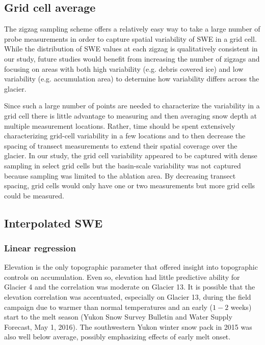 \documentclass[review,oneside, letterpaper]{igs}
\begin{document}
\subsection{Grid cell average}

The zigzag sampling scheme offers a relatively easy way to take a large number of probe measurements in order to capture spatial variability of SWE in a grid cell. While the distribution of SWE values at each zigzag is qualitatively consistent in our study, future studies would benefit from increasing the number of zigzags and focusing on areas with both high variability (e.g. debris covered ice) and low variability (e.g. accumulation area) to determine how variability differs across the glacier.

Since such a large number of points are needed to characterize the variability in a grid cell there is little advantage to measuring and then averaging snow depth at multiple measurement locations. Rather, time should be spent extensively characterizing grid-cell variability in a few locations and to then decrease the spacing of transect measurements to extend their spatial coverage over the glacier. In our study, the grid cell variability appeared to be captured with dense sampling in select grid cells but the basin-scale variability was not captured because sampling was limited to the ablation area. By decreasing transect spacing, grid cells would only have one or two measurements but more grid cells could be measured. 

\subsection{Interpolated SWE}

\subsubsection{Linear regression}

Elevation is the only topographic parameter that offered insight into topographic controls on accumulation. Even so, elevation had little predictive ability for Glacier 4 and the correlation was moderate on Glacier 13. It is possible that the elevation correlation was accentuated, especially on Glacier 13, during the field campaign due to warmer than normal temperatures and an early ($1-2$ weeks) start to the melt season (Yukon Snow Survey Bulletin and Water Supply Forecast, May 1, 2016). The southwestern Yukon winter snow pack in 2015 was also well below average, possibly emphasizing effects of early melt onset.
\end{document}
